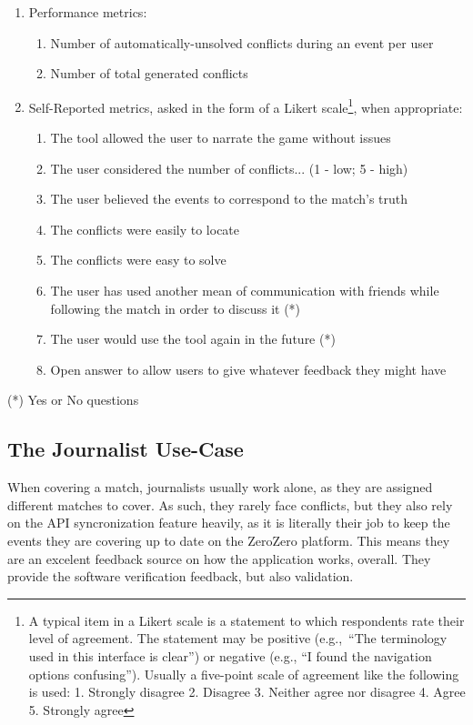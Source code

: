 \begin{enumerate}
    \item Performance metrics:
    \begin{enumerate}
        \item Number of automatically-unsolved conflicts during an event per user
        \item Number of total generated conflicts
    \end{enumerate}
    \item Self-Reported metrics, asked in the form of a Likert scale\footnote{A typical item in a Likert scale is a statement to which respondents rate
    their level of agreement. The statement may be positive (e.g.,\ “The terminology used in this interface is clear”) or negative (e.g., “I found the navigation options confusing”). Usually a five-point scale of agreement like the following is used: 1. Strongly disagree 2. Disagree 3. Neither agree nor disagree 4. Agree 5. Strongly agree}, when appropriate:
    \begin{enumerate}
        \item The tool allowed the user to narrate the game without issues
        \item The user considered the number of conflicts... (1 - low; 5 - high)
        \item The user believed the events to correspond to the match's truth 
        \item The conflicts were easily to locate
        \item The conflicts were easy to solve \\
        \item The user has used another mean of communication with friends while following the match in order to discuss it (*) 
        \item The user would use the tool again in the future (*) \\
        \item Open answer to allow users to give whatever feedback they might have
    \end{enumerate}
\end{enumerate}

(*) Yes or No questions

\subsection{The Journalist Use-Case}
When covering a match, journalists usually work alone, as they are assigned different matches to cover. As such, they rarely face conflicts, but they also rely on the API syncronization feature heavily, as it is literally their job to keep the events they are covering up to date on the ZeroZero platform. This means they are an excelent feedback source on how the application works, overall. They provide the software verification feedback, but also validation.

